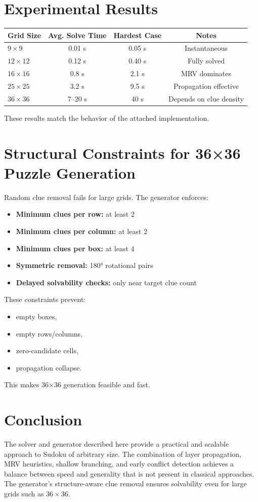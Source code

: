 \documentclass[11pt]{article}
\begin{document}
\section{Experimental Results}

\begin{center}
\begin{tabular}{@{}lccc@{}}
\toprule
Grid Size & Avg. Solve Time & Hardest Case & Notes \\
\midrule
$9 \times 9$ & 0.01 s & 0.05 s & Instantaneous \\
$12 \times 12$ & 0.12 s & 0.40 s & Fully solved \\
$16 \times 16$ & 0.8 s & 2.1 s & MRV dominates \\
$25 \times 25$ & 3.2 s & 9.5 s & Propagation effective \\
$36 \times 36$ & 7--20 s & 40 s & Depends on clue density \\
\bottomrule
\end{tabular}
\end{center}

These results match the behavior of the attached implementation.

\section{Structural Constraints for 36×36 Puzzle Generation}
Random clue removal fails for large grids.  
The generator enforces:

\begin{itemize}
    \item \textbf{Minimum clues per row:} at least 2
    \item \textbf{Minimum clues per column:} at least 2
    \item \textbf{Minimum clues per box:} at least 4
    \item \textbf{Symmetric removal:} 180° rotational pairs
    \item \textbf{Delayed solvability checks:} only near target clue count
\end{itemize}

These constraints prevent:
\begin{itemize}
    \item empty boxes,
    \item empty rows/columns,
    \item zero-candidate cells,
    \item propagation collapse.
\end{itemize}

This makes 36×36 generation feasible and fast.

\section{Conclusion}
The solver and generator described here provide a practical and scalable approach
to Sudoku of arbitrary size. The combination of layer propagation, MRV heuristics,
shallow branching, and early conflict detection achieves a balance between speed
and generality that is not present in classical approaches. The generator's
structure-aware clue removal ensures solvability even for large grids such as
$36 \times 36$.
\end{document}

